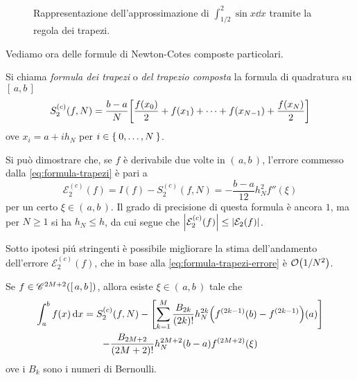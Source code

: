 	\begin{figure}[tpb]
		\centering
		
		\caption{Rappresentazione dell'approssimazione di \(\int_{1 / 2}^2 \sin x \dd{x}\) tramite la regola dei trapezi.}
	\end{figure}

	Vediamo ora delle formule di Newton-Cotes composte particolari.
	
	\begin{definizione}
		Si chiama \emph{formula dei trapezi} o \emph{del trapezio composta} la formula di quadratura su \([\, a, b \,]\)
		\begin{equation}\label{eq:formula-trapezi}
			S_2^{(c)} (f, N) = \frac{b - a}{N} \qty[\frac{f (x_0)}{2} + f (x_1) + \dots + f (x_{N - 1}) + \frac{f (x_N)}{2}]
		\end{equation}
		ove \(x_i = a + i h_N\) per \(i \in \Set{0, \dots, N}\).
	\end{definizione}

	Si può dimostrare che, se \(f\) è derivabile due volte in \((\, a, b \,)\), l'errore commesso dalla \eqref{eq:formula-trapezi} è pari a
	\begin{equation}\label{eq:formula-trapezi-errore}
		\mathcal{E}_2^{(c)} (f) = I (f) - S_2^{(c)} (f, N) = - \frac{b - a}{12} h_N^2 f'' (\xi)
	\end{equation}
	per un certo \(\xi \in (\, a, b \,)\). Il grado di precisione di questa formula è ancora \(1\), ma per \(N \ge 1\) si ha \(h_N \le h\), da cui segue che \(\abs{\mathcal{E}_2^{(c)} (f)} \le \abs{\mathcal{E}_2 (f)}\).
	
	Sotto ipotesi piú stringenti è possibile migliorare la stima dell'andamento dell'errore \(\mathcal{E}_2^{(c)} (f)\), che in base alla \eqref{eq:formula-trapezi-errore} è \(\order{1 / N^2}\).
	
	\begin{teorema}
		Se \(f \in \mathscr{C}^{2 M + 2} ([\, a, b \,])\), allora esiste \(\xi \in (\, a, b \,)\) tale che
		\begin{multline}\label{eq:formula-eulero-maclaurin}
			\int_a^b f (x) \dd{x} = S_2^{(c)} (f, N) - \qty[\sum_{k = 1}^M \frac{B_{2 k}}{(2 k)!} h_N^{2 k} \qty(f^{(2 k - 1)} (b) - f^{(2 k - 1)}) (a)] \\
			- \frac{B_{2 M + 2}}{(2 M + 2)!} h_N^{2 M + 2} (b - a) f^{(2 M + 2)} (\xi)
		\end{multline}
		ove i \(B_k\) sono i numeri di Bernoulli.
	\end{teorema}

